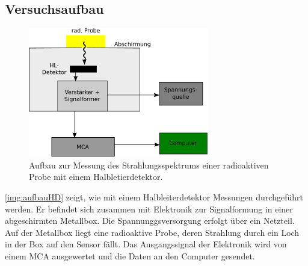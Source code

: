 \subsection{Versuchsaufbau}

\begin{figure}[H]
\begin{center}
  \includegraphics[width=0.7\textwidth]{../img/aufbauHD.pdf}
  \caption{Aufbau zur Messung des Strahlungsspektrums einer radioaktiven Probe mit einem Halbletierdetektor.}
  \label{img:aufbauHD}
\end{center}
\end{figure}
\autoref{img:aufbauHD} zeigt, wie mit einem Halbleiterdetektor Messungen durchgeführt werden.
Er befindet sich zusammen mit Elektronik zur Signalformung in einer abgeschirmten Metallbox.
Die Spannunggsversorgung erfolgt über ein Netzteil.
Auf der Metallbox liegt eine radioaktive Probe, deren Strahlung durch ein Loch in der Box auf den Sensor fällt.
Das Ausgangssignal der Elektronik wird von einem MCA ausgewertet und die Daten an den Computer gesendet.